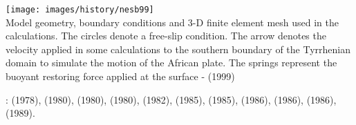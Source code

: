 \begin{center}
\texttt{[image: images/history/nesb99]}\\
{\captionfont Model geometry, boundary conditions and 3-D finite element mesh used in 
the calculations. The circles denote a free-slip condition. The arrow denotes the velocity 
applied in some calculations to the southern boundary of the Tyrrhenian domain to simulate 
the motion of the African plate. The springs represent the buoyant restoring force applied 
at the surface - \textcite{nesb99} (1999)}
\end{center}

\Literature: 
\textcite{gart78} (1978), 
\textcite{anbr80} (1980), 
\textcite{mera80} (1980), 
\textcite{bran80} (1980),
\textcite{engl82} (1982),
\textcite{thar85} (1985), 
\textcite{scan85} (1985),
\textcite{enho86} (1986), 
\textcite{mofr86} (1986),
\textcite{zupa86} (1986), 
\textcite{boww89} (1989).




